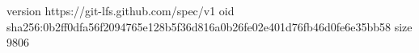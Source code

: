 version https://git-lfs.github.com/spec/v1
oid sha256:0b2ff0dfa56f2094765e128b5f36d816a0b26fe02e401d76fb46d0fe6e35bb58
size 9806
